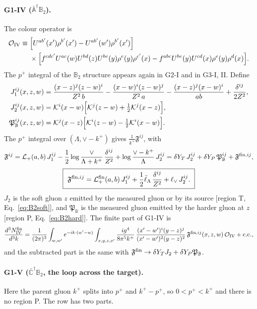 \documentclass[aps,prd,onecolumn,superscriptaddress,nofootinbib,floatfix,longbibliography,11pt]{revtex4-2}
\numberwithin{equation}{section}
\newcommand{\KK}{\mathcal{K}}
\def\mf#1{\mathbb{#1}}
\newcommand{\lV}{\ell_{\vee}}
\newcommand{\lLb}{\bar\ell_{\Lambda}}
\newcommand{\Lp}{\mathcal{L}_{+}}
\newcommand{\pre}{\frac{1}{(2\pi)^3}\int_{w,w'}e^{-ik\cdot(w'-w)}}
\newcommand{\Ord}{\mathcal{O}}
\begin{document}
\paragraph*{G1-IV ($\bar{\mf A}^\dagger\mf B_2$).} The colour operator is
\begin{align}
\Ord_{\rm IV}\equiv{}&\Big[U^{ab'}(x')\rho^{b'}(x')-U^{ab'}(w')\rho^{b'}(x')\Big]\notag\\
&\times\Big[f^{cdc'}U^{ac}(w)U^{bd}(z)U^{be}(y)\rho^e(y)\rho^{c'}(x)-f^{abc}U^{be}(y)U^{cd}(x)\rho^e(y)\rho^d(x)\Big].
\end{align}
The $p^+$ integral of the $\mf B_2$ structure appears again in G2-I and in G3-I, II. Define
\begin{align}
J_1^{ij}(x,z,w)&=\frac{(x-z)^j(z-w)^i}{Z^2\,b}-\frac{(x-w)^i(z-w)^j}{Z^2\,a}-\frac{(x-z)^j(x-w)^i}{ab}+\frac{\delta^{ij}}{2Z^2},\notag\\
J_2^{ij}(x,z,w)&=\KK^i(x-w)\Big[\KK^j(z-w)+\tfrac12\KK^j(x-z)\Big],\notag\\
\mathfrak P_{\mf B}^{ij}(x,z,w)&=\KK^j(x-z)\Big[\KK^i(z-w)-\tfrac12\KK^i(x-w)\Big].
\label{eq:J12}
\end{align}
The $p^+$ integral over $(\Lambda,\vee-k^+)$ gives $\frac{1}{k^+}\mathfrak F^{ij}$, with
\begin{equation}
\mathfrak F^{ij}=\Lp(a,b)\,J_1^{ij}-\frac12\log\frac{\vee}{\Lambda+k^+}\,\frac{\delta^{ij}}{Z^2}+\log\frac{\vee-k^+}{\Lambda}\,J_2^{ij}=\delta Y_T\,J_2^{ij}+\delta Y_P\,\mathfrak P_{\mf B}^{ij}+\mathfrak F^{{\rm fin},ij},
\label{eq:Fcal}
\end{equation}
\begin{equation}
\boxed{\ \mathfrak F^{{\rm fin},ij}=\Lp^{\rm fin}(a,b)\,J_1^{ij}+\frac12\lLb\,\frac{\delta^{ij}}{Z^2}+\lV\,J_2^{ij}.\ }
\label{eq:Ffin}
\end{equation}
$J_2$ is the soft gluon $z$ emitted by the measured gluon or by its source [region T, Eq.~\eqref{eq:B2soft}], and $\mathfrak P_{\mf B}$ is the measured gluon emitted by the harder gluon at $z$ [region P, Eq.~\eqref{eq:B2hard}]. The finite part of G1-IV is
\begin{equation}
\frac{d^3N^{\rm fin}_{\rm IV}}{d^3k}=\pre\int_{x,y,z,x'}\frac{ig^4}{8\pi^5k^+}\,\frac{(x'-w')^i(y-z)^j}{(x'-w')^2(y-z)^2}\,\mathfrak F^{{\rm fin},ij}(x,z,w)\,\Ord_{\rm IV}+{\rm c.c.},
\label{eq:finIV}
\end{equation}
and the subtracted part is the same with $\mathfrak F^{\rm fin}\to\delta Y_TJ_2+\delta Y_P\mathfrak P_{\mf B}$.

\paragraph*{G1-V ($\bar{\mf C}^\dagger\mf B_2$, the loop across the target).} Here the parent gluon $k^+$ splits into $p^+$ and $k^+-p^+$, so $0<p^+<k^+$ and there is no region P. The row has two parts.
\end{document}

